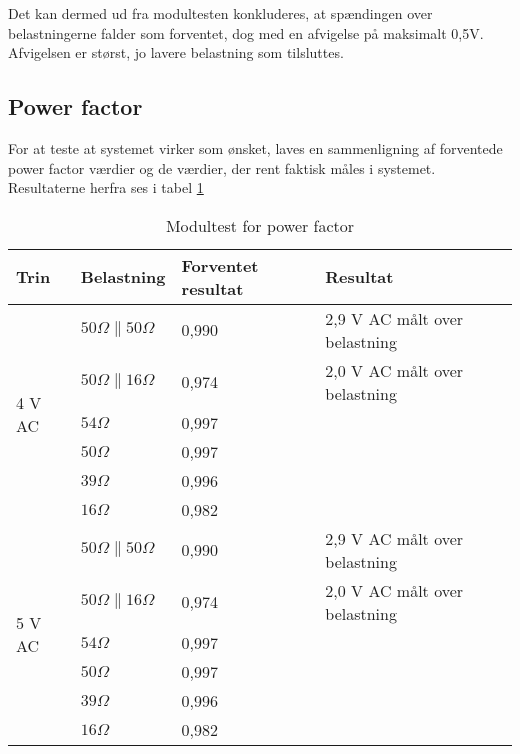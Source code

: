 Det kan dermed ud fra modultesten konkluderes, at spændingen over belastningerne falder som forventet, dog med en afvigelse på maksimalt 0,5V. Afvigelsen er størst, jo lavere belastning som tilsluttes. 


\subsection{Power factor}

For at teste at systemet virker som ønsket, laves en sammenligning af forventede power factor værdier og de værdier, der rent faktisk måles i systemet. Resultaterne herfra ses i tabel \ref{tab:Modultestpow}
\begin{table}[H]
	\centering
	\begin{tabular}{|l|l|l|l|}
		\hline
		\textbf{Trin} & \textbf{Belastning} & \textbf{Forventet resultat} & \textbf{Resultat} \\\hline
		
		\multirow{6}{*}{4 V AC} 
		& $50 \Omega\parallel 50 \Omega$ & 0,990 & 2,9 V AC målt over belastning \\\hhline{~---} 	
		& $50 \Omega\parallel 16 \Omega$ & 0,974 & 2,0 V AC målt over belastning \\\hhline{~---}
		& $54 \Omega$ & 0,997 &  \\\hhline{~---} 
		& $50 \Omega$ &0,997  &  \\\hhline{~---} 	
		& $39 \Omega$ & 0,996 &  \\\hhline{~---} 
		& $16 \Omega$ & 0,982 &  \\\hline 
		
		
		\multirow{6}{*}{5 V AC} 
		& $50 \Omega\parallel 50 \Omega$ & 0,990 & 2,9 V AC målt over belastning \\\hhline{~---} 	
		& $50 \Omega\parallel 16 \Omega$ & 0,974 & 2,0 V AC målt over belastning \\\hhline{~---}
		& $54 \Omega$ & 0,997 &  \\\hhline{~---} 
		& $50 \Omega$ & 0,997 &  \\\hhline{~---} 	
		& $39 \Omega$ & 0,996 &  \\\hhline{~---} 
		& $16 \Omega$ & 0,982 &  \\\hline 

		
	\end{tabular}
	\caption{Modultest for power factor}
	\label{tab:Modultestpow}
\end{table}